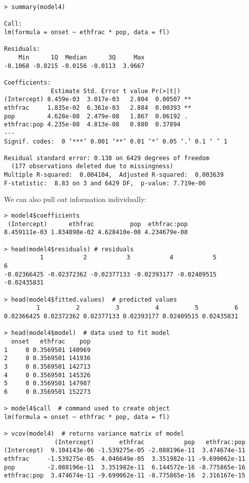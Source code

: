\begin{lstlisting}
> summary(model4)

Call:
lm(formula = onset ~ ethfrac * pop, data = fl)

Residuals:
    Min      1Q  Median      3Q     Max 
-0.1068 -0.0215 -0.0156 -0.0113  3.9667 

Coefficients:
             Estimate Std. Error t value Pr(>|t|)   
(Intercept) 8.459e-03  3.017e-03   2.804  0.00507 **
ethfrac     1.835e-02  6.361e-03   2.884  0.00393 **
pop         4.628e-08  2.479e-08   1.867  0.06192 . 
ethfrac:pop 4.235e-08  4.813e-08   0.880  0.37894   
---
Signif. codes:  0 ‘***’ 0.001 ‘**’ 0.01 ‘*’ 0.05 ‘.’ 0.1 ‘ ’ 1

Residual standard error: 0.138 on 6429 degrees of freedom
  (177 observations deleted due to missingness)
Multiple R-squared:  0.004104,	Adjusted R-squared:  0.003639 
F-statistic:  8.83 on 3 and 6429 DF,  p-value: 7.719e-06
\end{lstlisting}

We can also pull out information individually:

\begin{lstlisting}
> model4$coefficients
 (Intercept)      ethfrac          pop  ethfrac:pop 
8.459111e-03 1.834898e-02 4.628410e-08 4.234679e-08 

> head(model4$residuals) # residuals
          1           2           3           4           5           6 
-0.02366425 -0.02372362 -0.02377133 -0.02393177 -0.02409515 -0.02435831
 
> head(model4$fitted.values)  # predicted values
         1          2          3          4          5          6 
0.02366425 0.02372362 0.02377133 0.02393177 0.02409515 0.02435831 

> head(model4$model)  # data used to fit model
  onset   ethfrac    pop
1     0 0.3569501 140969
2     0 0.3569501 141936
3     0 0.3569501 142713
4     0 0.3569501 145326
5     0 0.3569501 147987
6     0 0.3569501 152273

> model4$call  # command used to create object
lm(formula = onset ~ ethfrac * pop, data = fl)

> vcov(model4)  # returns variance matrix of model
              (Intercept)       ethfrac           pop   ethfrac:pop
(Intercept)  9.104143e-06 -1.539275e-05 -2.088196e-11  3.474674e-11
ethfrac     -1.539275e-05  4.046649e-05  3.351982e-11 -9.699062e-11
pop         -2.088196e-11  3.351982e-11  6.144572e-16 -8.775865e-16
ethfrac:pop  3.474674e-11 -9.699062e-11 -8.775865e-16  2.316167e-15
\end{lstlisting}

